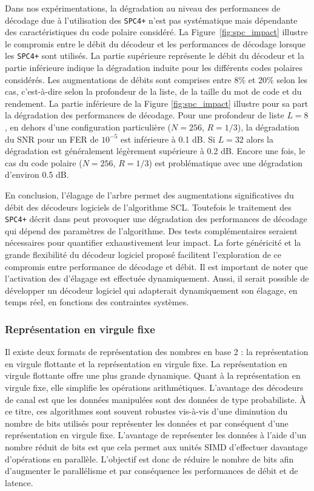 Dans nos expérimentations, la dégradation au niveau des performances de décodage due à l'utilisation des \noeuds \texttt{SPC4+} n'est pas systématique mais dépendante des caractéristiques du code polaire considéré. La Figure~\ref{fig:spc_impact} illustre le compromis entre le débit du décodeur et les performances de décodage lorsque les \noeuds \texttt{SPC4+} sont utilisés. La partie supérieure représente le débit du décodeur et la partie inférieure indique la dégradation induite pour les différents codes polaires considérés. Les augmentations de débits sont comprises entre 8\% et 20\% selon les cas, c'est-à-dire selon la profondeur de la liste, de la taille du mot de code et du rendement. La partie inférieure de la Figure \ref{fig:spc_impact} illustre pour sa part la dégradation des performances de décodage. Pour une profondeur de liste $L=8$, en dehors d'une configuration particulière ($N=256$, $R=1/3$), la dégradation du SNR pour un FER de $10^{-5}$ est inférieure à 0.1 dB. Si $L=32$ alors la dégradation est généralement légèrement supérieure à 0.2 dB. Encore une fois, le cas du code polaire ($N=256$, $R=1/3$) est problématique avec une dégradation d'environ 0.5 dB.

En conclusion, l'élagage de l'arbre permet des augmentations significatives du débit des décodeurs logiciels de l'algorithme SCL. Toutefois le traitement des \noeuds \texttt{SPC4+} décrit dans \cite{sarkis_fast_2016} peut provoquer une dégradation des performances de décodage qui dépend des paramètres de l'algorithme. Des tests complémentaires seraient nécessaires pour quantifier exhaustivement leur impact. La forte généricité et la grande flexibilité du décodeur logiciel proposé facilitent l'exploration de ce compromis entre performance de décodage et débit. Il est important de noter que l'activation des \noeuds d'élagage est effectuée dynamiquement. Aussi, il serait possible de développer un décodeur logiciel qui adapterait dynamiquement son élagage, en temps réel, en fonctions des contraintes systèmes.

\subsubsection{Représentation en virgule fixe}

Il existe deux formats de représentation des nombres en base 2 : la représentation en virgule flottante et la représentation en virgule fixe. La représentation en virgule flottante offre une plus grande dynamique. Quant à la représentation en virgule fixe, elle simplifie les opérations arithmétiques. L'avantage des décodeurs de canal est que les données manipulées sont des données de type probabiliste. \`A ce titre, ces algorithmes sont souvent robustes vis-à-vis d'une diminution du nombre de bits utilisés pour représenter les données et par conséquent d'une représentation en virgule fixe.
L'avantage de représenter les données à l'aide d'un nombre réduit de bits est que cela permet aux unités SIMD d'effectuer davantage d'opérations en parallèle. 
L'objectif est donc de réduire le nombre de bits afin d'augmenter le parallélisme et par conséquence les performances de débit et de latence.

